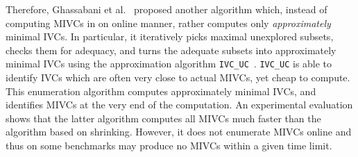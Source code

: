Therefore, Ghassabani et al.~\cite{Ghass17AllIVCs} proposed another algorithm which, instead of computing MIVCs in on online manner,
rather computes only \emph{approximately} minimal IVCs. In particular, it iteratively picks maximal unexplored subsets, checks them for adequacy, and turns the adequate subsets into approximately minimal IVCs using the approximation algorithm \texttt{IVC\_UC}~\cite{Ghass16}. \texttt{IVC\_UC} is able to identify IVCs which are often very close to actual MIVCs, yet cheap to compute. This enumeration algorithm computes approximately minimal IVCs, and identifies MIVCs  at the very end of the computation.  An experimental evaluation shows that the latter algorithm computes all MIVCs much faster than the algorithm based on shrinking. However, it does not enumerate MIVCs online and thus on some benchmarks may produce no MIVCs within a given time limit.

